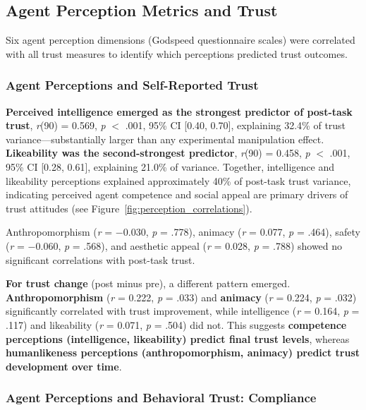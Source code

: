 \documentclass[12pt]{article}
\begin{document}
\subsection{Agent Perception Metrics and Trust}

Six agent perception dimensions (Godspeed questionnaire scales) were correlated with all trust measures to identify which perceptions predicted trust outcomes.

\subsubsection{Agent Perceptions and Self-Reported Trust}

\textbf{Perceived intelligence emerged as the strongest predictor of post-task trust}, \textit{r}(90) = 0.569, \textit{p} $<$ .001, 95\% CI [0.40, 0.70], explaining 32.4\% of trust variance---substantially larger than any experimental manipulation effect. \textbf{Likeability was the second-strongest predictor}, \textit{r}(90) = 0.458, \textit{p} $<$ .001, 95\% CI [0.28, 0.61], explaining 21.0\% of variance. Together, intelligence and likeability perceptions explained approximately 40\% of post-task trust variance, indicating perceived agent competence and social appeal are primary drivers of trust attitudes (see Figure~\ref{fig:perception_correlations}).

Anthropomorphism (\textit{r} = $-$0.030, \textit{p} = .778), animacy (\textit{r} = 0.077, \textit{p} = .464), safety (\textit{r} = $-$0.060, \textit{p} = .568), and aesthetic appeal (\textit{r} = 0.028, \textit{p} = .788) showed no significant correlations with post-task trust.

\textbf{For trust change} (post minus pre), a different pattern emerged. \textbf{Anthropomorphism} (\textit{r} = 0.222, \textit{p} = .033) and \textbf{animacy} (\textit{r} = 0.224, \textit{p} = .032) significantly correlated with trust improvement, while intelligence (\textit{r} = 0.164, \textit{p} = .117) and likeability (\textit{r} = 0.071, \textit{p} = .504) did not. This suggests \textbf{competence perceptions (intelligence, likeability) predict final trust levels}, whereas \textbf{humanlikeness perceptions (anthropomorphism, animacy) predict trust development over time}.

\subsubsection{Agent Perceptions and Behavioral Trust: Compliance}
\end{document}
